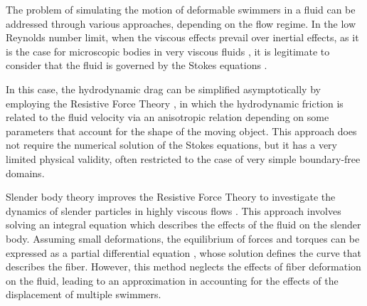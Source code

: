 \documentclass[graybox]{svmult}
\begin{document}





The problem of simulating the motion of deformable swimmers in a fluid can be addressed through various approaches, depending on the flow regime. In the low Reynolds number limit, when the viscous effects prevail over inertial effects, as it is the case for microscopic bodies in very viscous fluids \cite{Purcell77}, it is legitimate to consider that the fluid is governed by the Stokes equations \cite{BrennerHappel65,PowersLauga09}. 



In this case, the hydrodynamic drag can be simplified asymptotically by employing the Resistive Force Theory \cite{GrayHanccok}, in which the hydrodynamic friction is related to the fluid velocity via an %
anisotropic relation %
depending on some parameters that account for the shape of the moving object. This approach does not require the numerical solution of the Stokes equations, but it has a
very limited physical validity, often restricted to the case of very simple boundary-free domains.

Slender body theory improves the Resistive Force Theory
to investigate the dynamics of slender particles in highly viscous flows \cite{cox1970motion, batchelor1970slender, keller1976slender,johnson1980improved}. 
This approach involves solving an integral equation which describes the effects of the fluid on the slender body. Assuming small deformations, the equilibrium of forces and torques can be expressed as a partial differential equation \cite{Gadhela_2013,  Clement_2018, Zakarya_2022}, whose solution defines the curve that describes the fiber. However, this method neglects the effects of fiber deformation on the fluid, leading to an approximation in accounting for the effects of the displacement of multiple swimmers.
\end{document}
